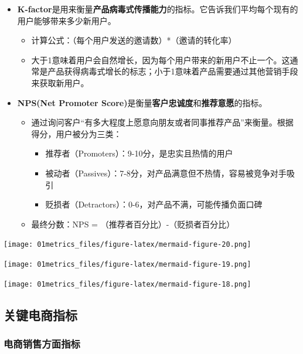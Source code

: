 \documentclass[
  letterpaper,
  DIV=11,
  numbers=noendperiod]{scrreprt}
\providecommand{\tightlist}{%
  \setlength{\itemsep}{0pt}\setlength{\parskip}{0pt}}
\begin{document}
\begin{itemize}
\item
  \textbf{K-factor}是用来衡量\textbf{产品病毒式传播能力}的指标。它告诉我们平均每个现有的用户能够带来多少新用户。

  \begin{itemize}
  \tightlist
  \item
    计算公式：（每个用户发送的邀请数）*（邀请的转化率）
  \item
    大于1意味着用户会自然增长，因为每个用户带来的新用户不止一个。这通常是产品获得病毒式增长的标志；小于1意味着产品需要通过其他营销手段来获取新用户。
  \end{itemize}
\item
  \textbf{NPS(Net Promoter
  Score)}是衡量\textbf{客户忠诚度}和\textbf{推荐意愿}的指标。

  \begin{itemize}
  \item
    通过询问客户``有多大程度上愿意向朋友或者同事推荐产品''来衡量。根据得分，用户被分为三类：

    \begin{itemize}
    \item
      推荐者（Promoters）：9-10分，是忠实且热情的用户
    \item
      被动者（Passives）：7-8分，对产品满意但不热情，容易被竞争对手吸引
    \item
      贬损者（Detractors）：0-6，对产品不满，可能传播负面口碑
    \end{itemize}
  \item
    最终分数：NPS = （推荐者百分比）-（贬损者百分比）
  \end{itemize}
\end{itemize}

\texttt{[image: 01metrics\_files/figure-latex/mermaid-figure-20.png]}

\texttt{[image: 01metrics\_files/figure-latex/mermaid-figure-19.png]}

\texttt{[image: 01metrics\_files/figure-latex/mermaid-figure-18.png]}

\subsection{关键电商指标}\label{ux5173ux952eux7535ux5546ux6307ux6807}

\subsubsection{\texorpdfstring{\textbf{电商销售方面指标}}{电商销售方面指标}}\label{ux7535ux5546ux9500ux552eux65b9ux9762ux6307ux6807}
\end{document}
